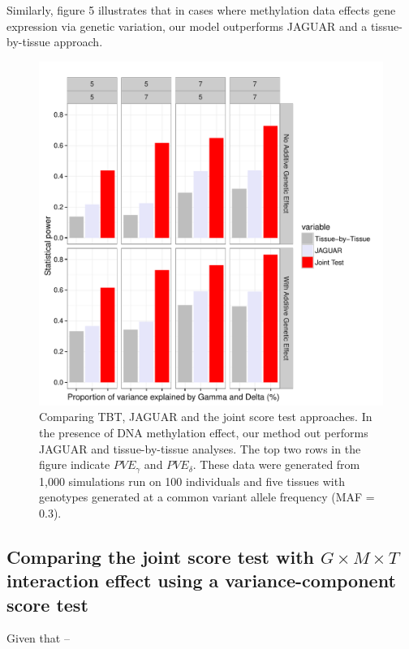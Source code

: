 \documentclass[hidelinks]{article}
\begin{document}
Similarly, figure 5 illustrates that in cases where methylation data effects gene expression via genetic variation, our model outperforms JAGUAR and a tissue-by-tissue approach.
\begin{center}
\begin{figure}[!ht]
\includegraphics[width=\textwidth]{JT_JAG_TBT_Jan27.pdf}
\caption{Comparing TBT, JAGUAR and the joint score test approaches. In the presence of DNA methylation effect, our method out performs JAGUAR and tissue-by-tissue analyses. The top two rows in the figure indicate $PVE_\gamma$ and $PVE_\delta$. These data were generated from 1,000 simulations run on 100 individuals and five tissues with genotypes generated at a common variant allele frequency (MAF = 0.3).}
\end{figure}
\end{center}

\subsection{Comparing the joint score test with $G \times M \times T$ interaction effect using a variance-component score test}

Given that --
\end{document}
